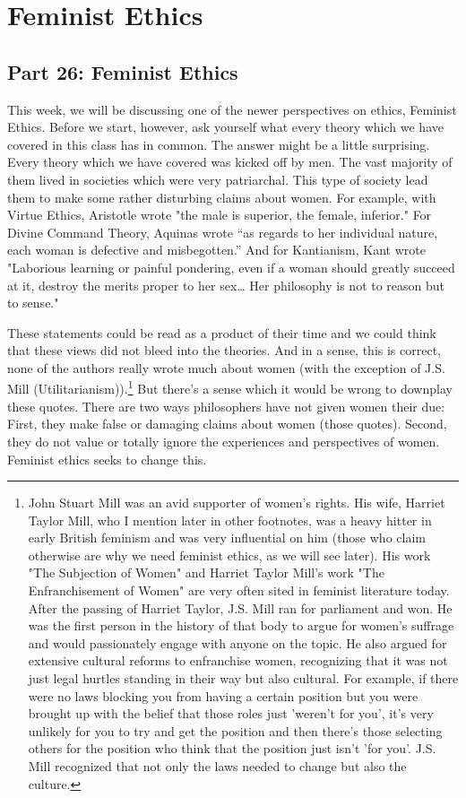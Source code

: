\part{Feminist Ethics}
\label{ch.mod9}
\chapter{Part 26: Feminist Ethics}

This week, we will be discussing one of the newer perspectives on ethics, Feminist Ethics. Before we start, however, ask yourself what every theory which we have covered in this class has in common. The answer might be a little surprising. Every theory which we have covered was kicked off by men. The vast majority of them lived in societies which were very patriarchal. This type of society lead them to make some rather disturbing claims about women. For example, with Virtue Ethics, Aristotle wrote "the male is superior, the female, inferior." For Divine Command Theory, Aquinas wrote “as regards to her individual nature, each woman is defective and misbegotten.” And for Kantianism, Kant wrote "Laborious learning or painful pondering, even if a woman should greatly succeed at it, destroy the merits proper to her sex… Her philosophy is not to reason but to sense."

These statements could be read as a product of their time and we could think that these views did not bleed into the theories. And in a sense, this is correct, none of the authors really wrote much about women (with the exception of J.S. Mill (Utilitarianism)).\footnote{John Stuart Mill was an avid supporter of women's rights. His wife, Harriet Taylor Mill, who I mention later in other footnotes, was a heavy hitter in early British feminism and was very influential on him (those who claim otherwise are why we need feminist ethics, as we will see later). His work "The Subjection of Women" and Harriet Taylor Mill's work "The Enfranchisement of Women" are very often sited in feminist literature today. After the passing of Harriet Taylor, J.S. Mill ran for parliament and won. He was the first person in the history of that body to argue for women's suffrage and would passionately engage with anyone on the topic. He also argued for extensive cultural reforms to enfranchise women, recognizing that it was not just legal hurtles standing in their way but also cultural. For example, if there were no laws blocking you from having a certain position but you were brought up with the belief that those roles just 'weren't for you', it's very unlikely for you to try and get the position and then there's those selecting others for the position who think that the position just isn't 'for you'. J.S. Mill recognized that not only the laws needed to change but also the culture.} But there’s a sense which it would be wrong to downplay these quotes. There are two ways philosophers have not given women their due: First, they make false or damaging claims about women (those quotes). Second, they do not value or totally ignore the experiences and perspectives of women. Feminist ethics seeks to change this.

